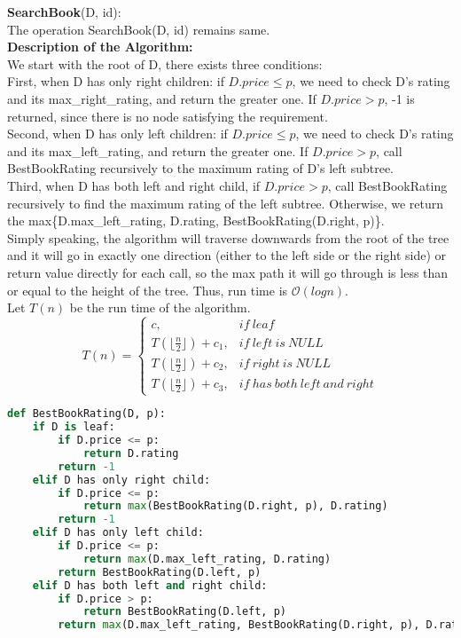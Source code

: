 \documentclass[10pt]{article}
\begin{document}
\begin{enumerate}
\textbf{SearchBook}(D, id):\\
The operation SearchBook(D, id) remains same.\\
\textbf{Description of the Algorithm:}\\
We start with the root of D, there exists three conditions:\\
First, when D has only right children: if $D.price \leq p$, we need to check  D's rating and its max\_right\_rating, and return the greater one. If $D.price > p$, -1 is returned, since there is no node satisfying the requirement.\\
Second, when D has only left children: if $D.price \leq p$, we need to check  D's rating and its max\_left\_rating, and return the greater one. If $D.price > p$, call BestBookRating recursively to the maximum rating of D's left subtree.\\
Third, when D has both left and right child, if $D.price > p$, call BestBookRating recursively to find the maximum rating of the left subtree. Otherwise, we return the max\{D.max\_left\_rating, D.rating, BestBookRating(D.right, p)\}.\\
Simply speaking, the algorithm will traverse downwards from the root of the tree and it will go in exactly one direction (either to the left side or the right side) or return value directly for each call, so the max path it will go through is less than or equal to the height of the tree. Thus, run time is $\mathcal{O}(logn)$.\\
Let $T(n)$ be the run time of the algorithm.
\begin{equation*}
  T(n)=\begin{cases}
    c, &if\ leaf\\
    T( \lfloor\frac{n}{2}\rfloor) + c_1, &if\ left\ is\ NULL\\
    T(\lfloor\frac{n}{2}\rfloor) + c_2, &if\ right\ is\ NULL\\
    T(\lfloor\frac{n}{2}\rfloor) + c_3, &if\ has\ both\ left\ and\ right
  \end{cases}
\end{equation*}

\begin{lstlisting}[language=Python]
def BestBookRating(D, p):
	if D is leaf:
		if D.price <= p:
			return D.rating
		return -1
	elif D has only right child:
		if D.price <= p:
			return max(BestBookRating(D.right, p), D.rating)
		return -1
	elif D has only left child:
		if D.price <= p:
			return max(D.max_left_rating, D.rating)
		return BestBookRating(D.left, p)
	elif D has both left and right child:
		if D.price > p:
			return BestBookRating(D.left, p)
		return max(D.max_left_rating, BestBookRating(D.right, p), D.rating)
\end{lstlisting}



\end{enumerate}
\end{document}
